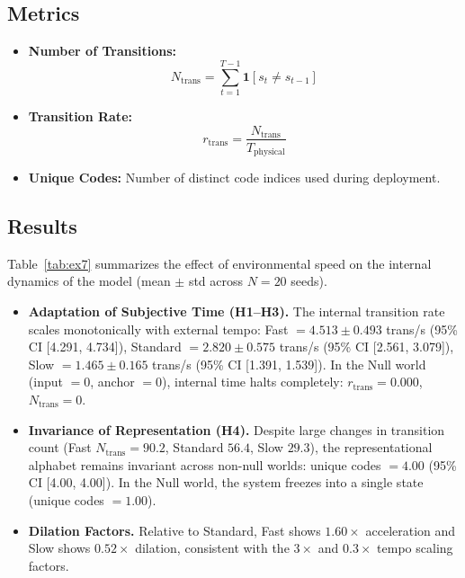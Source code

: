 \documentclass{article}
\begin{document}
\subsection{Metrics}
\begin{itemize}
    \item \textbf{Number of Transitions:}
    \begin{equation}
        N_{\text{trans}} = \sum_{t=1}^{T-1} \mathbf{1}[s_t \neq s_{t-1}]
    \end{equation}
    \item \textbf{Transition Rate:}
    \begin{equation}
        r_{\text{trans}} = \frac{N_{\text{trans}}}{T_{\text{physical}}}
    \end{equation}
    \item \textbf{Unique Codes:} Number of distinct code indices used during deployment.
\end{itemize}

\subsection{Results}

Table~\ref{tab:ex7} summarizes the effect of environmental speed on the internal dynamics of the model (mean $\pm$ std across $N=20$ seeds).



\begin{itemize}
    \item \textbf{Adaptation of Subjective Time (H1--H3).}
    The internal transition rate scales monotonically with external tempo:
    Fast $= 4.513 \pm 0.493$ trans/s (95\% CI [4.291, 4.734]),
    Standard $= 2.820 \pm 0.575$ trans/s (95\% CI [2.561, 3.079]),
    Slow $= 1.465 \pm 0.165$ trans/s (95\% CI [1.391, 1.539]).
    In the Null world (input $= 0$, anchor $= 0$), internal time halts completely: $r_{\text{trans}} = 0.000$, $N_{\text{trans}} = 0$.

    \item \textbf{Invariance of Representation (H4).}
    Despite large changes in transition count (Fast $N_{\text{trans}} = 90.2$, Standard $56.4$, Slow $29.3$), the representational alphabet remains invariant across non-null worlds: unique codes $= 4.00$ (95\% CI [4.00, 4.00]).
    In the Null world, the system freezes into a single state (unique codes $= 1.00$).

    \item \textbf{Dilation Factors.}
    Relative to Standard, Fast shows $1.60\times$ acceleration and Slow shows $0.52\times$ dilation, consistent with the $3\times$ and $0.3\times$ tempo scaling factors.
\end{itemize}
\end{document}
